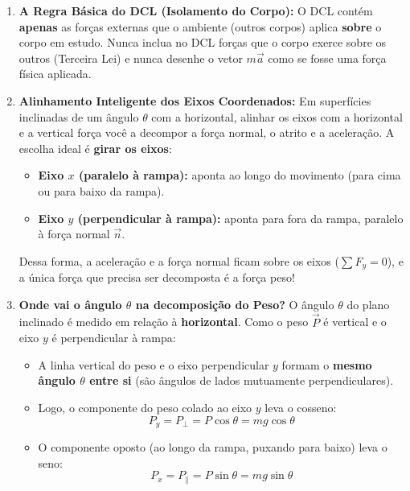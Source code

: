 \documentclass[11pt,a4paper]{article}
\begin{document}
\begin{enumerate}[label=\textbf{\Roman*.}]
    \item \textbf{A Regra Básica do DCL (Isolamento do Corpo):}
    O DCL contém \textbf{apenas} as forças externas que o ambiente (outros corpos) aplica \textbf{sobre} o corpo em estudo. Nunca inclua no DCL forças que o corpo exerce sobre os outros (Terceira Lei) e nunca desenhe o vetor $m\vec{a}$ como se fosse uma força física aplicada.

    \item \textbf{Alinhamento Inteligente dos Eixos Coordenados:}
    Em superfícies inclinadas de um ângulo $\theta$ com a horizontal, alinhar os eixos com a horizontal e a vertical força você a decompor a força normal, o atrito e a aceleração. A escolha ideal é \textbf{girar os eixos}:
    \begin{itemize}
        \item \textbf{Eixo $x$ (paralelo à rampa):} aponta ao longo do movimento (para cima ou para baixo da rampa).
        \item \textbf{Eixo $y$ (perpendicular à rampa):} aponta para fora da rampa, paralelo à força normal $\vec{n}$.
    \end{itemize}
    Dessa forma, a aceleração e a força normal ficam sobre os eixos ($\sum F_y = 0$), e a única força que precisa ser decomposta é a força peso!

    \item \textbf{Onde vai o ângulo $\theta$ na decomposição do Peso?}
    O ângulo $\theta$ do plano inclinado é medido em relação à \textbf{horizontal}. Como o peso $\vec{P}$ é vertical e o eixo $y$ é perpendicular à rampa:
    \begin{itemize}
        \item A linha vertical do peso e o eixo perpendicular $y$ formam o \textbf{mesmo ângulo $\theta$ entre si} (são ângulos de lados mutuamente perpendiculares).
        \item Logo, o componente do peso colado ao eixo $y$ leva o cosseno:
        \[ P_y = P_\perp = P \cos\theta = mg \cos\theta \]
        \item O componente oposto (ao longo da rampa, puxando para baixo) leva o seno:
        \[ P_x = P_\parallel = P \sin\theta = mg \sin\theta \]
    \end{itemize}


\end{enumerate}
\end{document}
